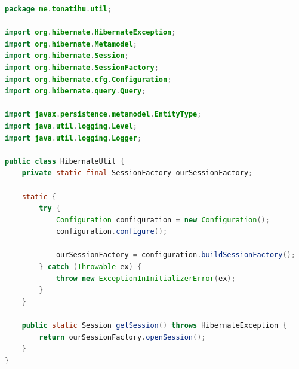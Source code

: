 \documentclass[a4paper,12pt]{article}
\begin{document}
\begin{lstlisting}[language=Java, style=customJava, 
caption={HibernateUtil.java}, captionpos=b,basicstyle=\fontfamily{cmss}\small]
package me.tonatihu.util;

import org.hibernate.HibernateException;
import org.hibernate.Metamodel;
import org.hibernate.Session;
import org.hibernate.SessionFactory;
import org.hibernate.cfg.Configuration;
import org.hibernate.query.Query;

import javax.persistence.metamodel.EntityType;
import java.util.logging.Level;
import java.util.logging.Logger;

public class HibernateUtil {
    private static final SessionFactory ourSessionFactory;

    static {
        try {
            Configuration configuration = new Configuration();
            configuration.configure();

            ourSessionFactory = configuration.buildSessionFactory();
        } catch (Throwable ex) {
            throw new ExceptionInInitializerError(ex);
        }
    }

    public static Session getSession() throws HibernateException {
        return ourSessionFactory.openSession();
    }
}
\end{lstlisting}
\end{document}
